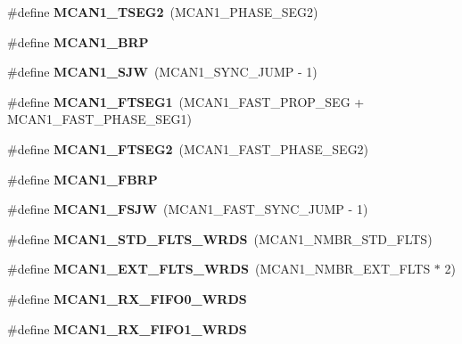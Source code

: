 \begin{DoxyCompactItemize}
\mbox{\label{group__can__module_gae1718ddf23a68bf7039f7fec4d15069c}} 
\#define {\bfseries M\+C\+A\+N1\+\_\+\+T\+S\+E\+G2}~(M\+C\+A\+N1\+\_\+\+P\+H\+A\+S\+E\+\_\+\+S\+E\+G2)
\item 
\#define {\bfseries M\+C\+A\+N1\+\_\+\+B\+RP}
\item 
\mbox{\label{group__can__module_gae7c3e880c460a246b649b51f04bd5bb0}} 
\#define {\bfseries M\+C\+A\+N1\+\_\+\+S\+JW}~(M\+C\+A\+N1\+\_\+\+S\+Y\+N\+C\+\_\+\+J\+U\+MP -\/ 1)
\item 
\mbox{\label{group__can__module_ga0059bfa3c44749a7437d70b2a3b2c542}} 
\#define {\bfseries M\+C\+A\+N1\+\_\+\+F\+T\+S\+E\+G1}~(M\+C\+A\+N1\+\_\+\+F\+A\+S\+T\+\_\+\+P\+R\+O\+P\+\_\+\+S\+EG + M\+C\+A\+N1\+\_\+\+F\+A\+S\+T\+\_\+\+P\+H\+A\+S\+E\+\_\+\+S\+E\+G1)
\item 
\mbox{\label{group__can__module_gaa75c16493259a193e34738851c321cb5}} 
\#define {\bfseries M\+C\+A\+N1\+\_\+\+F\+T\+S\+E\+G2}~(M\+C\+A\+N1\+\_\+\+F\+A\+S\+T\+\_\+\+P\+H\+A\+S\+E\+\_\+\+S\+E\+G2)
\item 
\#define {\bfseries M\+C\+A\+N1\+\_\+\+F\+B\+RP}
\item 
\mbox{\label{group__can__module_gac4faba5e0a031df0f4391f74f7a780fa}} 
\#define {\bfseries M\+C\+A\+N1\+\_\+\+F\+S\+JW}~(M\+C\+A\+N1\+\_\+\+F\+A\+S\+T\+\_\+\+S\+Y\+N\+C\+\_\+\+J\+U\+MP -\/ 1)
\item 
\mbox{\label{group__can__module_ga7305e1bb031123681171f4b9f4095531}} 
\#define {\bfseries M\+C\+A\+N1\+\_\+\+S\+T\+D\+\_\+\+F\+L\+T\+S\+\_\+\+W\+R\+DS}~(M\+C\+A\+N1\+\_\+\+N\+M\+B\+R\+\_\+\+S\+T\+D\+\_\+\+F\+L\+TS)
\item 
\mbox{\label{group__can__module_ga893725c94aa755ae26c3975d3fcd819f}} 
\#define {\bfseries M\+C\+A\+N1\+\_\+\+E\+X\+T\+\_\+\+F\+L\+T\+S\+\_\+\+W\+R\+DS}~(M\+C\+A\+N1\+\_\+\+N\+M\+B\+R\+\_\+\+E\+X\+T\+\_\+\+F\+L\+TS $\ast$ 2)
\item 
\#define {\bfseries M\+C\+A\+N1\+\_\+\+R\+X\+\_\+\+F\+I\+F\+O0\+\_\+\+W\+R\+DS}
\item 
\#define {\bfseries M\+C\+A\+N1\+\_\+\+R\+X\+\_\+\+F\+I\+F\+O1\+\_\+\+W\+R\+DS}

\end{DoxyCompactItemize}
